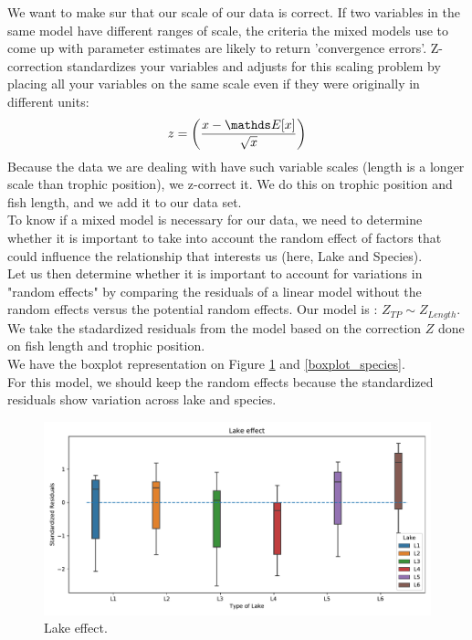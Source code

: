 \documentclass{article}
\begin{document}
We want to make sur that our scale of our data is correct. If two variables in the same model have different ranges of scale, the criteria the mixed models use to come up with parameter estimates are likely to return 'convergence errors'. Z-correction standardizes your variables and adjusts for this scaling problem by placing all your variables on the same scale even if they were originally in different units:
\begin{equation*}
    z = \left(\frac{x - \bbE[x]}{\sqrt{x}}\right)
\end{equation*}
Because the data we are dealing with have such variable scales (length is a longer scale than trophic position), we z-correct it. We do this on trophic position and fish length, and we add it to our data set. \\
To know if a mixed model is necessary for our data, we need to determine whether it is important to take into account the random effect of factors that could influence the relationship that interests us (here, Lake and Species).\\
Let us then determine whether it is important to account for variations in "random effects" by comparing
the residuals of a linear model without the random effects versus the potential random effects.
Our model is : $Z_{TP} \sim Z_{Length}$.\\
We take the stadardized residuals from the model based on the correction $Z$ done on fish length and trophic position.\\
We have the boxplot representation on Figure \ref{boxplot_lake} and \ref{boxplot_species}.\\
For this model, we should keep the random effects because the standardized residuals show variation across lake and species.
\begin{figure}[h!]
    \centering
    \includegraphics[scale = 0.6]{images/boxplot_lake_effect.pdf}
    \caption{Lake effect.}
    \label{boxplot_lake}
\end{figure}
    
\end{document}
